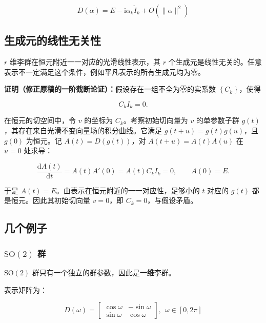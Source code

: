 \begin{equation}
D\left(\alpha\right)
=E-\mathrm{i}\alpha_k \tilde{I}_k+O\left(\lVert\alpha\rVert^2\right)
\end{equation}

\subsection{生成元的线性无关性}

$r$ 维李群在恒元附近一一对应的光滑线性表示，其 $r$ 个生成元是线性无关的。任意表示不一定满足这个条件，例如平凡表示的所有生成元均为零。

\textbf{证明（修正原稿的一阶截断论证）：}假设存在一组不全为零的实系数 $\left\{C_k\right\}$，使得

\begin{equation}
C_kI_k=0.
\end{equation}

在恒元的切空间中，令 $v$ 的坐标为 $C_k$。考察初始切向量为 $v$ 的单参数子群 $g\left(t\right)$，其存在来自光滑不变向量场的积分曲线。它满足 $g\left(t+u\right)=g\left(t\right)g\left(u\right)$，且 $g\left(0\right)$ 为恒元。记 $A\left(t\right)=D\left(g\left(t\right)\right)$，对 $A\left(t+u\right)=A\left(t\right)A\left(u\right)$ 在 $u=0$ 处求导：

\begin{equation}
\frac{\mathrm{d}A\left(t\right)}{\mathrm{d}t}=A\left(t\right)A'\left(0\right)=A\left(t\right)C_kI_k=0,\qquad A\left(0\right)=E.
\end{equation}

于是 $A\left(t\right)=E$。由表示在恒元附近的一一对应性，足够小的 $t$ 对应的 $g\left(t\right)$ 都是恒元。因此其初始切向量 $v=0$，即 $C_k=0$，与假设矛盾。

\subsection{几个例子}

\subsubsection*{\texorpdfstring{$\mathrm{SO}\left(2\right)$ 群}{SO(2) 群}}

$\mathrm{SO}\left(2\right)$ 群只有一个独立的群参数，因此是\textbf{一维}李群。

表示矩阵为：

\begin{equation}
D\left(\omega\right)
=\begin{bmatrix}
\cos\omega &-\sin\omega \\
\sin\omega &\cos\omega
\end{bmatrix},~~
\omega\in \left[0,2\pi\right]
\end{equation}

